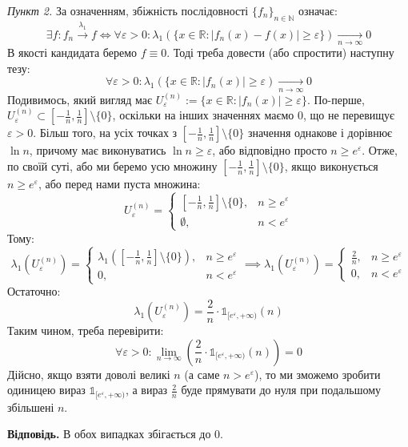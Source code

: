 \documentclass[14pt]{extarticle}
\begin{document}
\textit{Пункт 2.} За означенням, збіжність послідовності $\{f_n\}_{n \in \mathbb{N}}$ означає:
\[
\exists f: f_n \xrightarrow[]{\lambda_1} f \iff \forall \varepsilon > 0: \lambda_1\left(\{x \in \mathbb{R}: |f_n(x)-f(x)| \geq \varepsilon\}\right) \xrightarrow[n \to \infty]{} 0
\]
В якості кандидата беремо $f \equiv 0$. Тоді треба довести (або спростити) наступну тезу:
\[
\forall \varepsilon > 0: \lambda_1(\{x \in \mathbb{R}: |f_n(x)| \geq \varepsilon) \xrightarrow[n \to \infty]{} 0
\]
Подивимось, який вигляд має $U^{(n)}_{\varepsilon} := \{x \in \mathbb{R}: |f_n(x)| \geq \varepsilon\}$. По-перше, $U^{(n)}_{\varepsilon} \subset [-\frac{1}{n},\frac{1}{n}] \setminus \{0\}$, оскільки на інших значеннях маємо $0$, що не перевищує $\varepsilon>0$. Більш того, на усіх точках з $[-\frac{1}{n},\frac{1}{n}] \setminus \{0\}$ значення однакове і дорівнює $\ln n$, причому має виконуватись $\ln n \geq \varepsilon$, або відповідно просто $n \geq e^{\varepsilon}$. Отже, по своїй суті, або ми беремо усю множину $[-\frac{1}{n},\frac{1}{n}] \setminus \{0\}$, якщо виконується $n \geq e^{\varepsilon}$, або перед нами пуста множина:
\[
U^{(n)}_{\varepsilon} = \begin{cases}
    \left[-\frac{1}{n},\frac{1}{n}\right] \setminus \{0\}, & n \geq e^{\varepsilon} \\
    \emptyset, & n < e^{\varepsilon}
\end{cases}
\]
Тому:
\[
\lambda_1(U^{(n)}_{\varepsilon}) = \begin{cases}
    \lambda_1([-\frac{1}{n},\frac{1}{n}] \setminus \{0\}), & n \geq e^{\varepsilon} \\
    0, & n < e^{\varepsilon}
\end{cases} \implies \lambda_1(U^{(n)}_{\varepsilon}) =\begin{cases}
    \frac{2}{n}, & n \geq e^{\varepsilon} \\
    0, & n < e^{\varepsilon}
\end{cases}
\]
Остаточно:
\[
\lambda_1(U^{(n)}_{\varepsilon}) = \frac{2}{n} \cdot \mathds{1}_{[e^{\varepsilon},+\infty)}(n)
\]
Таким чином, треба перевірити:
\[
\forall \varepsilon > 0: \lim_{n \to \infty} \left(\frac{2}{n} \cdot \mathds{1}_{[e^{\varepsilon},+\infty)}(n)\right) = 0
\]
Дійсно, якщо взяти доволі великі $n$ (а саме $n > e^{\varepsilon}$), то ми зможемо зробити одиницею вираз $\mathds{1}_{[e^{\varepsilon},+\infty)}$, а вираз $\frac{2}{n}$ буде прямувати до нуля при подальшому збільшені $n$.

\textbf{Відповідь.} В обох випадках збігається до $0$.
\end{document}
